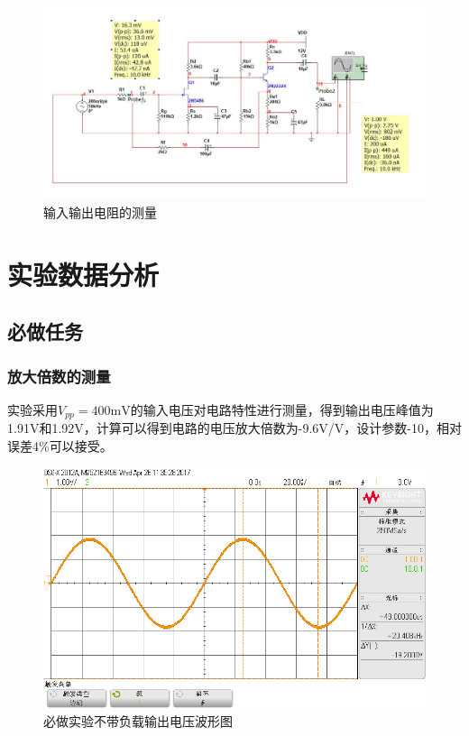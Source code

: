 \documentclass[UTF8,a4paper]{article}
\begin{document}
\begin{figure}
\centering
\includegraphics[width=\textwidth]{R2.jpg}
\caption{输入输出电阻的测量}
\label{R2}
\end{figure}
\clearpage
\section{实验数据分析}
\subsection{必做任务}
\subsubsection{放大倍数的测量}
实验采用$V_{pp}=400\mathrm{mV}$的输入电压对电路特性进行测量，得到输出电压峰值为1.91V和1.92V，计算可以得到电路的电压放大倍数为-9.6V/V，设计参数-10，相对误差4\%可以接受。

\begin{figure}
\centering
\includegraphics[width=\textwidth]{scope_0.bmp}
\caption{必做实验不带负载输出电压波形图}
\end{figure}
\end{document}
